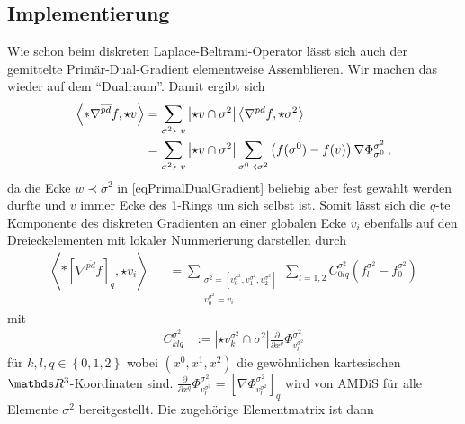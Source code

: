   \subsection{Implementierung}
    Wie schon beim diskreten Laplace-Beltrami-Operator lässt sich auch der gemittelte Primär-Dual-Gradient elementweise Assemblieren.
    Wir machen das wieder auf dem "`Dualraum"'. 
    Damit ergibt sich
    \begin{align}
      \left\langle *\nabla^{\overline{pd}} f, \star v \right\rangle
        &= \sum_{\sigma^{2}\succ v} \left| \star v \cap \sigma^{2} \right| 
                  \left\langle \nabla^{pd} f , \star\sigma^{2} \right\rangle \\
        &= \sum_{\sigma^{2}\succ v} \left| \star v \cap \sigma^{2} \right|
                 \sum_{\sigma^{0}\prec\sigma^{2}} \left( f(\sigma^{0}) - f(v) \right) \nabla\Phi_{\sigma^{0}}^{\sigma^{2}} \,\text{,}
    \end{align}
    da die Ecke \( w \prec \sigma^{2} \) in \eqref{eqPrimalDualGradient} beliebig aber fest gewählt werden durfte 
    und \( v \) immer Ecke des 1-Rings um sich selbst ist.
    Somit lässt sich die \( q \)-te Komponente des diskreten Gradienten an einer globalen Ecke \( v_{i} \) 
    ebenfalls auf den Dreieckelementen mit lokaler Nummerierung
    darstellen durch
    \begin{align}
      \left\langle *\left[ \nabla^{\overline{pd}} f \right]_{q}, \star v_{i} \right\rangle
          &&= \sum_{\substack{\sigma^{2}=\left[ v^{\sigma^{2}}_{0},v^{\sigma^{2}}_{1},v^{\sigma^{2}}_{2} \right]\\
                                               v^{\sigma^{2}}_{0} = v_{i}}}
                  \sum_{l=1,2} C^{\sigma^{2}}_{0lq} 
                      \left( f_{l}^{\sigma^{2}} - f_{0}^{\sigma^{2}}\right)
    \end{align}
    mit
    \begin{align}
      C^{\sigma^{2}}_{klq} &:= \left| \star v_{k}^{\sigma^{2}} \cap \sigma^{2} \right|
                               \frac{\partial}{\partial x^{q}} \Phi^{\sigma^{2}}_{v_{l}^{\sigma^{2}}}
    \end{align}
    für \( k,l,q\in\left\{ 0,1,2 \right\} \) wobei \( \left( x^{0}, x^{1}, x^{2} \right) \) die gewöhnlichen kartesischen \( \R^{3} \)-Koordinaten sind.
    \( \frac{\partial}{\partial x^{q}}\Phi^{\sigma^{2}}_{v_{l}^{\sigma^{2}}} = \left[ \nabla \Phi^{\sigma^{2}}_{v_{l}^{\sigma^{2}}} \right]_{q} \)
    wird von AMDiS für alle Elemente \( \sigma^{2} \) bereitgestellt.
    Die zugehörige Elementmatrix ist dann
